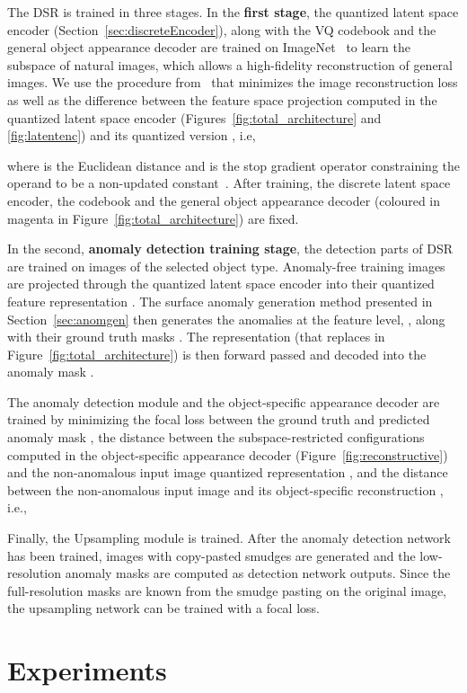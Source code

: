 \documentclass[runningheads]{llncs}
\begin{document}
The DSR is trained in three stages. In the \textbf{first stage},
the quantized latent space encoder (Section~\ref{sec:discreteEncoder}), along with the VQ codebook and the general object appearance decoder are trained on ImageNet~\cite{deng2009imagenet} to learn the subspace of natural images, which allows a high-fidelity reconstruction of general images. We use the procedure from~\cite{vqvae} that minimizes the image reconstruction loss as well as the difference between the feature space projection  computed in the quantized latent space encoder (Figures~\ref{fig:total_architecture} and \ref{fig:latentenc}) and its quantized version , i.e,

where  is the Euclidean distance and  is the stop gradient operator constraining the operand to be a non-updated constant~\cite{vqvae}. 
After training, the discrete latent space encoder, the codebook and the general object appearance decoder (coloured in magenta in Figure~\ref{fig:total_architecture}) are fixed.

In the second, \textbf{anomaly detection training stage}, the detection parts of DSR are trained on images of the selected object type.
Anomaly-free training images are projected through the quantized latent space encoder into their quantized feature representation . The surface anomaly generation method presented in Section~\ref{sec:anomgen} then generates the anomalies at the feature level, , along with their ground truth masks . The representation   (that replaces  in Figure~\ref{fig:total_architecture}) is then forward passed and decoded into the anomaly mask . 

The anomaly detection module and the object-specific appearance decoder are trained by minimizing the focal loss between the ground truth  and predicted anomaly mask , the  distance between the subspace-restricted configurations  computed in the object-specific appearance decoder (Figure~\ref{fig:reconstructive}) and the non-anomalous input image quantized representation , and the  distance between the non-anomalous input image  and its object-specific reconstruction , i.e.,


Finally, the Upsampling module is trained. After the anomaly detection network has been trained, images with copy-pasted smudges are generated and the low-resolution anomaly masks are computed as detection network outputs. Since the full-resolution masks are known from the smudge pasting on the original image, the upsampling network can be trained with a focal loss.


\section{Experiments}
\end{document}
